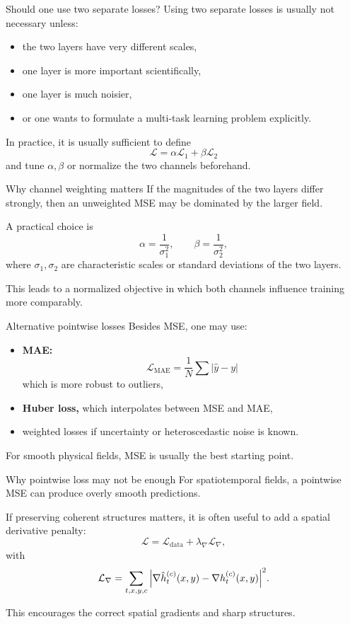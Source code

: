 \documentclass[aspectratio=169]{beamer}
\begin{document}
\begin{frame}{Should one use two separate losses?}
Using two separate losses is usually not necessary unless:
\begin{itemize}
\item the two layers have very different scales,
\item one layer is more important scientifically,
\item one layer is much noisier,
\item or one wants to formulate a multi-task learning problem explicitly.
\end{itemize}

In practice, it is usually sufficient to define
\[
\mathcal{L} = \alpha \mathcal{L}_1 + \beta \mathcal{L}_2
\]
and tune \(\alpha,\beta\) or normalize the two channels beforehand.
\end{frame}

\begin{frame}{Why channel weighting matters}
If the magnitudes of the two layers differ strongly, then an unweighted MSE may be dominated by the larger field.

A practical choice is
\[
\alpha = \frac{1}{\sigma_1^2},
\qquad
\beta = \frac{1}{\sigma_2^2},
\]
where \(\sigma_1,\sigma_2\) are characteristic scales or standard deviations of the two layers.

This leads to a normalized objective in which both channels influence training more comparably.
\end{frame}

\begin{frame}{Alternative pointwise losses}
Besides MSE, one may use:
\begin{itemize}
\item \textbf{MAE:}
\[
\mathcal{L}_{\mathrm{MAE}} = \frac{1}{N}\sum |\hat y-y|
\]
which is more robust to outliers,
\item \textbf{Huber loss,}
which interpolates between MSE and MAE,
\item weighted losses if uncertainty or heteroscedastic noise is known.
\end{itemize}

For smooth physical fields, MSE is usually the best starting point.
\end{frame}

\begin{frame}{Why pointwise loss may not be enough}
For spatiotemporal fields, a pointwise MSE can produce overly smooth predictions.

If preserving coherent structures matters, it is often useful to add a spatial derivative penalty:
\[
\mathcal{L}
=
\mathcal{L}_{\mathrm{data}}
+
\lambda_{\nabla}\mathcal{L}_{\nabla},
\]
with
\[
\mathcal{L}_{\nabla}
=
\sum_{t,x,y,c}
\abs{\nabla \hat h_t^{(c)}(x,y)-\nabla h_t^{(c)}(x,y)}^2.
\]

This encourages the correct spatial gradients and sharp structures.
\end{frame}
\end{document}

